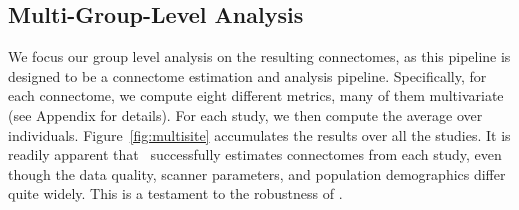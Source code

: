 \documentclass[11pt]{article}
\begin{document}
\subsection{Multi-Group-Level Analysis}



We focus our group level analysis on the resulting connectomes, as this pipeline is designed to be a connectome estimation and analysis pipeline.  Specifically, for each connectome, we compute eight different metrics, many of them multivariate (see Appendix for details).  For each study, we then compute the average over individuals.  Figure~\ref{fig:multisite} accumulates the results over all the studies.  It is readily apparent that \ndmg~successfully estimates connectomes from each study, even though the data quality, scanner parameters, and population demographics differ quite widely.  This is a testament to the robustness of \ndmg.  






\end{document}
